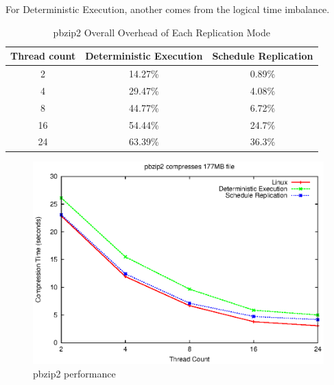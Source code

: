 For Deterministic Execution, another comes from the logical time imbalance.


\begin{table}
\caption{pbzip2 Overall Overhead of Each Replication Mode}
\begin{center}
 \begin{tabular}{c | c | c}
Thread count & Deterministic Execution & Schedule Replication \\ \hline
 2 & 14.27\% & 0.89\% \\ \hline
 4 & 29.47\% & 4.08\% \\ \hline
 8 & 44.77\% & 6.72\% \\ \hline
 16 & 54.44\% & 24.7\% \\ \hline
 24 & 63.39\% & 36.3\% \\ \hline 
 \end{tabular}
\end{center}
\label{t:pbzip2_overall}
\end{table}

\begin{figure}
\centering
\includegraphics[width=0.8\columnwidth]{figures/pbzip2_b10}
\caption{pbzip2 performance}
\label{f:pbzip_b10_performance}
\end{figure}

